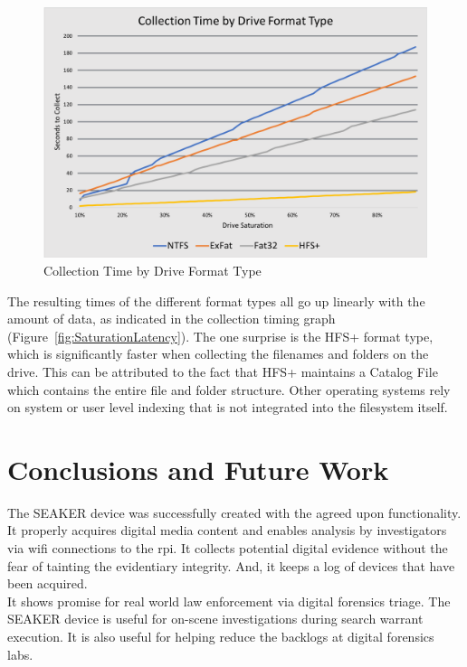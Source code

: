 \documentclass[12pt]{article}
\begin{document}
\begin{figure}[H]
  \begin{center}
  \includegraphics[width=13cm]{images/TimeVsDriveType.png}
  \caption{Collection Time by Drive Format Type}
  \label{fig:DriveType}
  \end{center}
\end{figure}

The resulting times of the different format types all go up linearly with the 
amount of data, as indicated in the collection timing graph
(Figure~\ref{fig:SaturationLatency}).
The one surprise is the HFS+ format type, which is significantly
faster when collecting the filenames and folders on the drive.  This can be
attributed to the fact that HFS+ maintains a Catalog File which contains the 
entire file and folder structure.  Other operating systems rely on system or user
level indexing that is not integrated into the filesystem itself.

\section{Conclusions and Future Work}
\label{sect-conclusionAndFutureWork}

The SEAKER device was successfully created with the agreed upon functionality.  It
properly acquires digital media content and enables analysis by investigators
via \gls{wifi} connections to the \gls{rpi}.  It collects potential digital
evidence without the fear of tainting the evidentiary integrity.  And, it keeps a
log of devices that have been acquired.\\

It shows promise for real world law enforcement via digital forensics triage.  The
SEAKER device is useful for on-scene investigations during search warrant
execution.  It is also useful for helping reduce the backlogs at digital
forensics labs.\\
\end{document}
